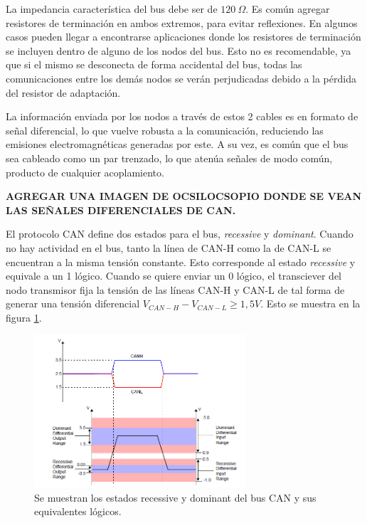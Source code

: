 La impedancia característica del bus debe ser de $120 \ \Omega$. Es común agregar resistores de terminación en ambos extremos, para evitar reflexiones. En algunos casos pueden llegar a encontrarse aplicaciones donde los resistores de terminación se incluyen dentro de alguno de los nodos del bus. Esto no es recomendable, ya que si el mismo se desconecta de forma accidental del bus, todas las comunicaciones entre los demás nodos se verán perjudicadas debido a la pérdida del resistor de adaptación.

La información enviada por los nodos a través de estos 2 cables es en formato de señal diferencial, lo que vuelve robusta a la comunicación, reduciendo las emisiones electromagnéticas generadas por este. A su vez, es común que el bus sea cableado como un par trenzado, lo que atenúa señales de modo común, producto de cualquier acoplamiento.

\textbf{{\color{red} AGREGAR UNA IMAGEN DE OCSILOCSOPIO DONDE SE VEAN LAS SEÑALES DIFERENCIALES DE CAN.}}

El protocolo CAN define dos estados para el bus, \textit{recessive} y \textit{dominant}. Cuando no hay actividad en el bus, tanto la línea de CAN-H como la de CAN-L se encuentran a la misma tensión constante. Esto corresponde al estado \textit{recessive} y equivale a un 1 lógico. Cuando se quiere enviar un 0 lógico, el transciever del nodo transmisor fija la tensión de las líneas CAN-H y CAN-L de tal forma de generar una tensión diferencial $V_{CAN-H} - V_{CAN-L} \geq 1,5 V$. Esto se muestra en la figura \ref{fig:CAN_recessive_dominant}.

\begin{figure}[H]
    \centering
    \includegraphics[width=0.7\textwidth]{img/CAN_recessive_dominant.png}
    \caption{Se muestran los estados recessive y dominant del bus CAN y sus equivalentes lógicos.}
    \label{fig:CAN_recessive_dominant}    
\end{figure}

